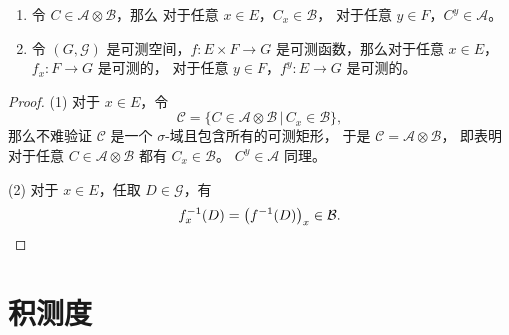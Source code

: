 \documentclass[fontset=none]{Notes}
\begin{document}
\begin{proposition}
  \mbox{}
  \begin{enumerate}
    \item 令 $C\in \mathcal{A}\otimes \mathcal{B}$，那么
    对于任意 $x\in E$，$C_x\in \mathcal{B}$，
    对于任意 $y\in F$，$C^y\in \mathcal{A}$。
    \item 令 $(G,\mathcal{G})$ 是可测空间，$f:E\times F\to G$
    是可测函数，那么对于任意 $x\in E$，$f_x:F\to G$ 是可测的，
    对于任意 $y\in F$，$f^y:E\to G$ 是可测的。
  \end{enumerate}
\end{proposition}
\begin{proof}
  (1) 对于 $x\in E$，令
  \[
    \mathcal{C}  =\{C\in \mathcal{A}\otimes \mathcal{B}\,|\, C_x\in \mathcal{B}\},
  \]
  那么不难验证 $\mathcal{C}$ 是一个 $\sigma$-域且包含所有的可测矩形，
  于是 $\mathcal{C}=\mathcal{A}\otimes \mathcal{B}$，
  即表明对于任意 $C\in \mathcal{A}\otimes \mathcal{B}$ 都有 $C_x\in \mathcal{B}$。
  $C^y\in \mathcal{A}$ 同理。

  (2) 对于 $x\in E$，任取 $D\in \mathcal{G}$，有
  \[
    f_x^{-1}(D)=\bigl(f^{-1}(D)\bigr)_x \in \mathcal{B}.\qedhere
  \]
\end{proof}


\section{积测度}
\end{document}
